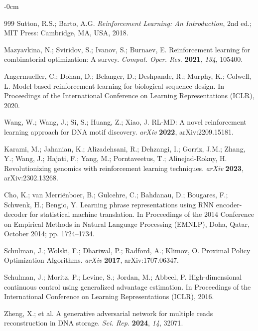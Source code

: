 \documentclass[entropy,article,submit,moreauthors]{Definitions/mdpi}
\begin{document}
\begin{adjustwidth}{-\extralength}{0cm}
\begin{thebibliography}{999}
Sutton, R.S.; Barto, A.G. \textit{Reinforcement Learning: An Introduction}, 2nd ed.; MIT Press: Cambridge, MA, USA, 2018.

Mazyavkina, N.; Sviridov, S.; Ivanov, S.; Burnaev, E. Reinforcement learning for combinatorial optimization: A survey. {\em Comput. Oper. Res.} {\bf 2021}, {\em 134}, 105400.

Angermueller, C.; Dohan, D.; Belanger, D.; Deshpande, R.; Murphy, K.; Colwell, L. Model-based reinforcement learning for biological sequence design. In Proceedings of the International Conference on Learning Representations (ICLR), 2020.

Wang, W.; Wang, J.; Si, S.; Huang, Z.; Xiao, J. RL-MD: A novel reinforcement learning approach for DNA motif discovery. {\em arXiv} {\bf 2022}, arXiv:2209.15181.

Karami, M.; Jahanian, K.; Alizadehsani, R.; Dehzangi, I.; Gorriz, J.M.; Zhang, Y.; Wang, J.; Hajati, F.; Yang, M.; Porntaveetus, T.; Alinejad-Rokny, H. Revolutionizing genomics with reinforcement learning techniques. {\em arXiv} {\bf 2023}, arXiv:2302.13268.

Cho, K.; van Merri{\"e}nboer, B.; Gulcehre, C.; Bahdanau, D.; Bougares, F.; Schwenk, H.; Bengio, Y. Learning phrase representations using RNN encoder-decoder for statistical machine translation. In Proceedings of the 2014 Conference on Empirical Methods in Natural Language Processing (EMNLP), Doha, Qatar, October 2014; pp. 1724--1734.

Schulman, J.; Wolski, F.; Dhariwal, P.; Radford, A.; Klimov, O. Proximal Policy Optimization Algorithms. {\em arXiv} {\bf 2017}, arXiv:1707.06347.

Schulman, J.; Moritz, P.; Levine, S.; Jordan, M.; Abbeel, P. High-dimensional continuous control using generalized advantage estimation. In Proceedings of the International Conference on Learning Representations (ICLR), 2016.

Zheng, X.; et al. A generative adversarial network for multiple reads reconstruction in DNA storage. {\em Sci. Rep.} {\bf 2024}, {\em 14}, 32071.

\end{thebibliography}

\PublishersNote{}
\end{adjustwidth}
\end{document}
